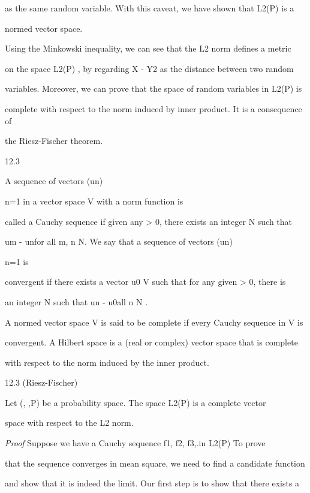 as the same random variable. With this caveat, we have shown that L2(P) is a

normed vector space.

Using the Minkowski inequality, we can see that the L2 norm defines a metric

on the space L2(P) , by regarding X - Y2 as the distance between two random

variables. Moreover, we can prove that the space of random variables in L2(P) is

complete with respect to the norm induced by inner product. It is a consequence of

the Riesz-Fischer theorem.

\begin{defbox}{12.3}
\end{defbox}

A sequence of vectors (un)\infty

n=1 in a vector space V with a norm function \cdot is

called a Cauchy sequence if given any \epsilon> 0, there exists an integer N such that

um - un\leq \epsilon for all m, n \geq N. We say that a sequence of vectors (un)\infty

n=1 is

convergent if there exists a vector u0 \in V such that for any given \epsilon> 0, there is

an integer N such that un - u0\leq \epsilonfor all n \geq N .

A normed vector space V is said to be complete if every Cauchy sequence in V is

convergent. A Hilbert space is a (real or complex) vector space that is complete

with respect to the norm induced by the inner product.

\begin{thmbox}{12.3 (Riesz-Fischer)}
\end{thmbox}

Let (\Omega, ,P) be a probability space. The space L2(P) is a complete vector

space with respect to the L2 norm.

\textit{Proof} Suppose we have a Cauchy sequence f1, f2, f3,.in L2(P) To prove

that the sequence converges in mean square, we need to find a candidate function

and show that it is indeed the limit. Our first step is to show that there exists a

